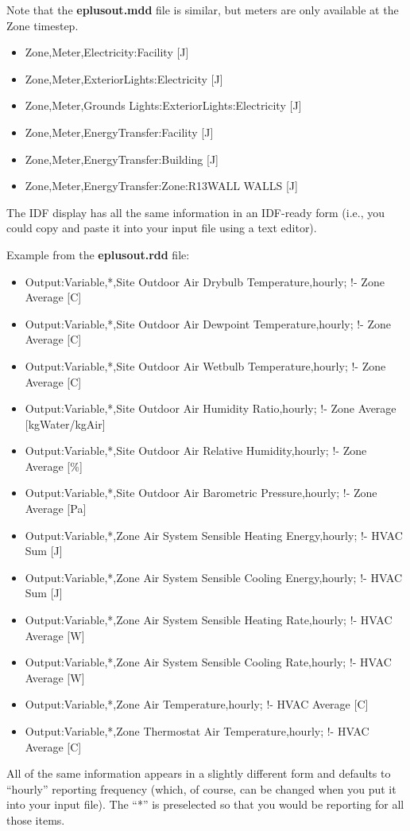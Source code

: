 Note that the \textbf{eplusout.mdd} file is similar, but meters are only available at the Zone timestep.

\begin{itemize}
\item
  Zone,Meter,Electricity:Facility {[}J{]}
\item
  Zone,Meter,ExteriorLights:Electricity {[}J{]}
\item
  Zone,Meter,Grounds Lights:ExteriorLights:Electricity {[}J{]}
\item
  Zone,Meter,EnergyTransfer:Facility {[}J{]}
\item
  Zone,Meter,EnergyTransfer:Building {[}J{]}
\item
  Zone,Meter,EnergyTransfer:Zone:R13WALL WALLS {[}J{]}
\end{itemize}

The IDF display has all the same information in an IDF-ready form (i.e., you could copy and paste it into your input file using a text editor).

Example from the \textbf{eplusout.rdd} file:

\begin{itemize}
\item
  Output:Variable,*,Site Outdoor Air Drybulb Temperature,hourly; !- Zone Average {[}C{]}
\item
  Output:Variable,*,Site Outdoor Air Dewpoint Temperature,hourly; !- Zone Average {[}C{]}
\item
  Output:Variable,*,Site Outdoor Air Wetbulb Temperature,hourly; !- Zone Average {[}C{]}
\item
  Output:Variable,*,Site Outdoor Air Humidity Ratio,hourly; !- Zone Average {[}kgWater/kgAir{]}
\item
  Output:Variable,*,Site Outdoor Air Relative Humidity,hourly; !- Zone Average {[}\%{]}
\item
  Output:Variable,*,Site Outdoor Air Barometric Pressure,hourly; !- Zone Average {[}Pa{]}
\item
  Output:Variable,*,Zone Air System Sensible Heating Energy,hourly; !- HVAC Sum {[}J{]}
\item
  Output:Variable,*,Zone Air System Sensible Cooling Energy,hourly; !- HVAC Sum {[}J{]}
\item
  Output:Variable,*,Zone Air System Sensible Heating Rate,hourly; !- HVAC Average {[}W{]}
\item
  Output:Variable,*,Zone Air System Sensible Cooling Rate,hourly; !- HVAC Average {[}W{]}
\item
  Output:Variable,*,Zone Air Temperature,hourly; !- HVAC Average {[}C{]}
\item
  Output:Variable,*,Zone Thermostat Air Temperature,hourly; !- HVAC Average {[}C{]}
\end{itemize}

All of the same information appears in a slightly different form and defaults to ``hourly'' reporting frequency (which, of course, can be changed when you put it into your input file). The ``*'' is preselected so that you would be reporting for all those items.
